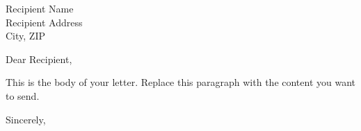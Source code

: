 \documentclass[11pt,a4paper]{letter}
\begin{document}
\begin{letter}{Recipient Name \\ Recipient Address \\ City, ZIP}

\opening{Dear Recipient,}

This is the body of your letter. Replace this paragraph with the
content you want to send.

\closing{Sincerely,}

\end{letter}
\end{document}
